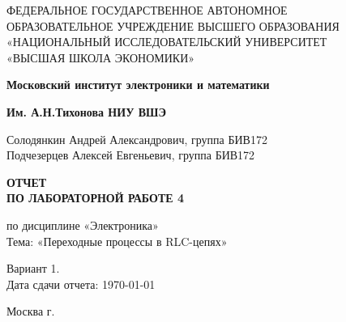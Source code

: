 \begin{titlepage}
	\begin{center}
		ФЕДЕРАЛЬНОЕ  ГОСУДАРСТВЕННОЕ АВТОНОМНОЕ \\
		ОБРАЗОВАТЕЛЬНОЕ УЧРЕЖДЕНИЕ ВЫСШЕГО ОБРАЗОВАНИЯ\\
		«НАЦИОНАЛЬНЫЙ ИССЛЕДОВАТЕЛЬСКИЙ УНИВЕРСИТЕТ\\
		«ВЫСШАЯ ШКОЛА ЭКОНОМИКИ»
	\end{center}
	
	\begin{center}
		\textbf{Московский институт электроники и математики}
		
		\textbf{Им. А.Н.Тихонова НИУ ВШЭ}
	\end{center}
	\vspace{1ex}	
	\begin{center}
		Солодянкин Андрей Александрович, группа БИВ172\\
		Подчезерцев Алексей Евгеньевич, группа БИВ172
	\end{center}	
	\vspace{1ex}
	\begin{center}
		\textbf{ОТЧЕТ\\
		ПО ЛАБОРАТОРНОЙ РАБОТЕ 4
	}
	\end{center}	
	\vspace{2ex}
	\begin{center}
		по дисциплине «Электроника»\\
		Тема: «Переходные процессы в RLC-цепях»
	\end{center}
	\vspace{2ex}
	\begin{center}
	Вариант 1.\\
	Дата сдачи отчета: \today
	\end{center}
	\vspace{2ex}
	\vfill
	\begin{center}
		Москва \the\year г.
	\end{center}
\end{titlepage}